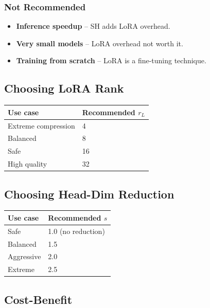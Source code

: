 \subsubsection{Not Recommended}

\begin{itemize}
\item \textbf{Inference speedup} -- SH adds LoRA overhead.
\item \textbf{Very small models} -- LoRA overhead not worth it.
\item \textbf{Training from scratch} -- LoRA is a fine-tuning technique.

\end{itemize}
\subsection{Choosing LoRA Rank}

\begin{table}[H]
\centering
\small
\begin{tabular}{ll}
\toprule
\textbf{Use case} & \textbf{Recommended $r_L$} \\
\midrule
Extreme compression & 4 \\
Balanced & 8 \\
Safe & 16 \\
High quality & 32 \\
\bottomrule
\end{tabular}
\end{table}

\subsection{Choosing Head-Dim Reduction}

\begin{table}[H]
\centering
\small
\begin{tabular}{ll}
\toprule
\textbf{Use case} & \textbf{Recommended $s$} \\
\midrule
Safe & 1.0 (no reduction) \\
Balanced & 1.5 \\
Aggressive & 2.0 \\
Extreme & 2.5 \\
\bottomrule
\end{tabular}
\end{table}

\subsection{Cost-Benefit}

